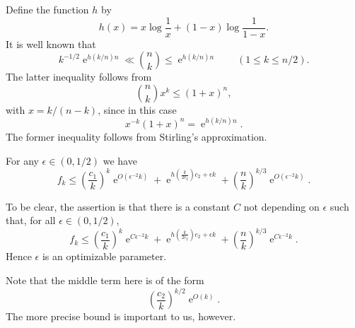 \documentclass[ALCO,ThmDefs,Unicode,epreuves]{cedram}
\DeclareMathOperator{\expe}{e}
\newcommand{\eps}{\epsilon}
\newcommand\br[1]{\left({#1}\right)}
\newcommand\pfrac[2]{\br{\frac{#1}{#2}}}
\begin{document}
Define the function $h$ by
\[
 h(x) = x \log \frac1x + (1-x) \log\frac1{1-x}.
\]
It is well known that
\[
 k^{-1/2} \expe^{h(k/n)n} \ll \binom{n}{k} \leq \expe^{h(k/n)n} \qquad (1\leq k\leq n/2).
\]
The latter inequality follows from
\[
 \binom{n}{k} x^k \leq (1+x)^n,
\]
with $x = k/(n-k)$, since in this case
\begin{equation}
 \label{h-identity}
 x^{-k}(1+x)^n = \expe^{h(k/n)n}.
\end{equation}
The former inequality follows from Stirling's approximation.

\begin{lemma} \label{fk-bound}
For any $\eps \in (0, 1/2)$ we have
\[
 f_k \leq
 \pfrac{c_1}{k}^k \expe^{O(\eps^{-2}k)} +
 \expe^{h\pfrac{k}{2c_2} c_2 + \eps k} +
 \pfrac{n}{k}^{k/3} \expe^{O(\eps^{-2}k)}
 .
\]
\end{lemma}

To be clear, the assertion is that there is a constant $C$ not depending on $\eps$ such that, for all $\eps \in (0, 1/2)$,
\[
 f_k \leq
 \pfrac{c_1}{k}^k \expe^{C \eps^{-2}k} +
 \expe^{h\pfrac{k}{2c_2} c_2 + \eps k} +
 \pfrac{n}{k}^{k/3} \expe^{C \eps^{-2}k}
 .
\]
Hence $\eps$ is an optimizable parameter.

Note that the middle term here is of the form
\[
 \pfrac{c_2}{k}^{k/2} \expe^{O(k)}.
\]
The more precise bound is important to us, however.
\end{document}
